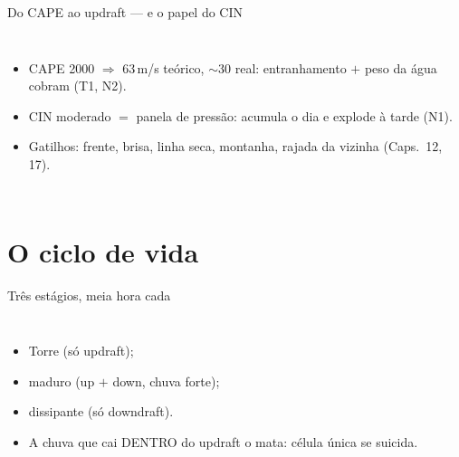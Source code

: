 \documentclass[aspectratio=169,11pt]{beamer}
\begin{document}
\begin{frame}{Do CAPE ao updraft — e o papel do CIN}
  \begin{columns}
    \vspace{0.4em}
    \begin{itemize}
      \item CAPE 2000 $\Rightarrow$ 63\,m/s teórico, $\sim$30 real:
            entranhamento $+$ peso da água cobram (T1, N2).
      \item CIN moderado $=$ panela de pressão: acumula o dia e
            \alert{explode à tarde} (N1).
      \item Gatilhos: frente, brisa, linha seca, montanha, rajada da
            vizinha (Caps.~12, 17).
    \end{itemize}
  \end{columns}
\end{frame}

\section{O ciclo de vida}

\begin{frame}{Três estágios, meia hora cada}
  \begin{columns}
    \begin{itemize}
      \item Torre (só updraft);
      \item maduro (up $+$ down, chuva forte);
      \item dissipante (só downdraft).
      \item A chuva que cai DENTRO do updraft o mata: célula única
            se suicida.
    \end{itemize}
  \end{columns}
\end{frame}
\end{document}
